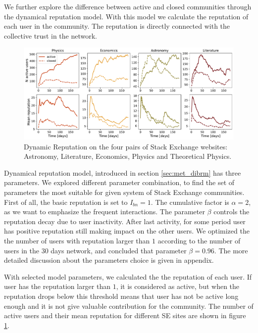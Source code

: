 We further explore the difference between active and closed communities through the dynamical reputation model. With this model we calculate the reputation of each user in the community. The reputation is directly connected with the collective trust in the network. 

\begin{figure}[h]
	\centering
	\includegraphics[width=\linewidth]{figures/stackexchange/reputation.pdf}
	\caption{Dynamic Reputation on the four pairs of Stack Exchange websites: Astronomy, Literature, Economics,  Physics and Theoretical Physics.}
	\label{fig:dr6panel}
\end{figure}



Dynamical reputation model, introduced in section \ref{sec:met_dibrm} has three parameters. We explored different parameter combination, to find the set of parameters the most suitable for given system of Stack Exchange communities. First of all, the basic reputation is set to $I_{bn}=1$. The cumulative factor is $\alpha=2$, as we want to emphasize the frequent interactions. The parameter $\beta$ controls the reputation decay due to user inactivity. After last activity, for some period user has positive reputation still making impact on the other users. We optimized the the number of users with reputation larger than $1$ according to the number of users in the 30 days network, and concluded that parameter $\beta=0.96$. The more detailed discussion about the parameters choice is given in appendix. 

With selected model parameters, we calculated the the reputation of each user. If user has the reputation larger than $1$, it is considered as active, but when the reputation drops below this threshold means that user has not be active long enough and it is not give valuable contribution for the community. The number of active users and their mean reputation for different SE sites are shown in figure \ref{fig:dr6panel}. 

